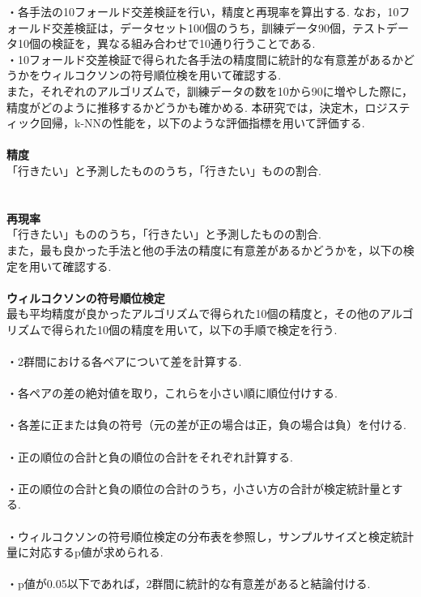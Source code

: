 \documentclass[12pt,a4j]{jreport}
\begin{document}
・各手法の10フォールド交差検証を行い，精度と再現率を算出する.
なお，10フォールド交差検証は，データセット100個のうち，訓練データ90個，テストデータ10個の検証を，異なる組み合わせで10通り行うことである.\\

・10フォールド交差検証で得られた各手法の精度間に統計的な有意差があるかどうかをウィルコクソンの符号順位検を用いて確認する.\\

また，それぞれのアルゴリズムで，訓練データの数を10から90に増やした際に，精度がどのように推移するかどうかも確かめる.
本研究では，決定木，ロジスティック回帰，k-NNの性能を，以下のような評価指標を用いて評価する.\\\\
\textbf{精度}\\
「行きたい」と予測したもののうち，「行きたい」ものの割合.\\\\\\
\textbf{再現率}\\
「行きたい」もののうち，「行きたい」と予測したものの割合.\\

また，最も良かった手法と他の手法の精度に有意差があるかどうかを，以下の検定を用いて確認する.\\\\
\textbf{ウィルコクソンの符号順位検定}\\
最も平均精度が良かったアルゴリズムで得られた10個の精度と，その他のアルゴリズムで得られた10個の精度を用いて，以下の手順で検定を行う.\\\\
・2群間における各ペアについて差を計算する.\\\\
・各ペアの差の絶対値を取り，これらを小さい順に順位付けする.\\\\
・各差に正または負の符号（元の差が正の場合は正，負の場合は負）を付ける.\\\\
・正の順位の合計と負の順位の合計をそれぞれ計算する.\\\\
・正の順位の合計と負の順位の合計のうち，小さい方の合計が検定統計量とする.\\\\
・ウィルコクソンの符号順位検定の分布表を参照し，サンプルサイズと検定統計量に対応するp値が求められる.\\\\
・p値が0.05以下であれば，2群間に統計的な有意差があると結論付ける.
\end{document}
